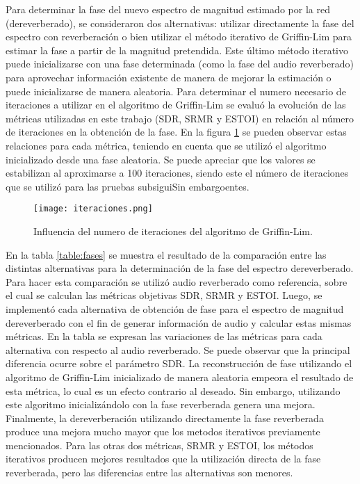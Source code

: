 Para determinar la fase del nuevo espectro de magnitud estimado por la red (dereverberado), se consideraron dos alternativas: utilizar directamente la fase del espectro con reverberación o bien utilizar el método iterativo de Griffin-Lim para estimar la fase a partir de la magnitud pretendida. Este último método iterativo puede inicializarse con una fase determinada (como la fase del audio reverberado) para aprovechar información existente de manera de mejorar la estimación o puede inicializarse de manera aleatoria. 
Para determinar el numero necesario de iteraciones a utilizar en el algoritmo de Griffin-Lim se evaluó la evolución de las métricas utilizadas en este trabajo (SDR, SRMR y ESTOI) en relación al número de iteraciones en la obtención de la fase. En la figura \ref{fig:iteraciones} se pueden observar estas relaciones para cada métrica, teniendo en cuenta que se utilizó el algoritmo inicializado desde una fase aleatoria. Se puede apreciar que los valores se estabilizan al aproximarse a 100 iteraciones, siendo este el número de iteraciones que se utilizó para las pruebas subsiguiSin embargoentes.     

\begin{figure}[H]
	\centering{}
	\texttt{[image: iteraciones.png]}
	\caption{Influencia del numero de iteraciones del algoritmo de Griffin-Lim.}
	\label{fig:iteraciones}
\end{figure}

En la tabla \ref{table:fases} se muestra el resultado de la comparación entre las distintas alternativas para la determinación de la fase del espectro dereverberado. Para hacer esta comparación se utilizó audio reverberado como referencia, sobre el cual se calculan las métricas objetivas SDR, SRMR y ESTOI. Luego, se implementó cada alternativa de obtención de fase para el espectro de magnitud dereverberado con el fin de generar información de audio y calcular estas mismas métricas. En la tabla se expresan las variaciones de las métricas para cada alternativa con respecto al audio reverberado. Se puede observar que la principal diferencia ocurre sobre el parámetro SDR. La reconstrucción de fase utilizando el algoritmo de Griffin-Lim inicializado de manera aleatoria empeora el resultado de esta métrica, lo cual es un efecto contrario al deseado. Sin embargo, utilizando este algoritmo inicializándolo con la fase reverberada genera una mejora. Finalmente, la dereverberación utilizando directamente la fase reverberada produce una mejora mucho mayor que los metodos iterativos previamente mencionados. Para las otras dos métricas, SRMR y ESTOI, los métodos iterativos producen mejores resultados que la utilización directa de la fase reverberada, pero las diferencias entre las alternativas son menores.

